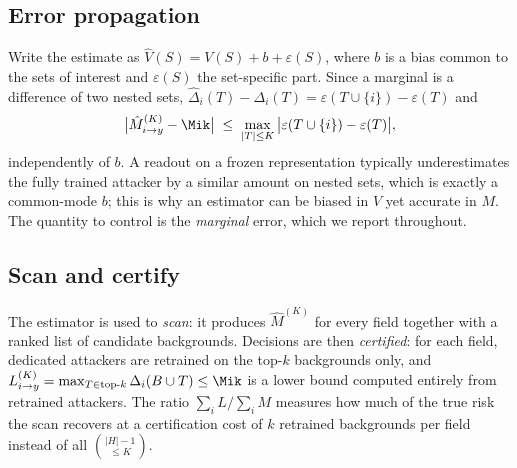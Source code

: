 \subsection{Error propagation}
Write the estimate as $\hat V(S)=V(S)+b+\varepsilon(S)$, where $b$ is a bias common to the sets
of interest and $\varepsilon(S)$ the set-specific part. Since a marginal is a difference of two
nested sets, $\hat\Delta_i(T)-\Delta_i(T)=\varepsilon(T\cup\{i\})-\varepsilon(T)$ and
\begin{equation}\label{eq:prop}
\big|\hat M^{(K)}_{i\to y} - \Mik\big| \;\le\; \max_{|T|\le K}\big|\varepsilon(T\cup\{i\})-\varepsilon(T)\big|,
\end{equation}
independently of $b$. A readout on a frozen representation typically underestimates the fully
trained attacker by a similar amount on nested sets, which is exactly a common-mode $b$; this is
why an estimator can be biased in $V$ yet accurate in $M$. The quantity to control is the
\emph{marginal} error, which we report throughout.

\subsection{Scan and certify}\label{sec:scan}
The estimator is used to \emph{scan}: it produces $\hat M^{(K)}$ for every field together with a
ranked list of candidate backgrounds. Decisions are then \emph{certified}: for each field,
dedicated attackers are retrained on the top-$k$ backgrounds only, and
$L^{(K)}_{i\to y}=\max_{T\in\text{top-}k}\Delta_i(B\cup T)\le\Mik$ is a lower bound computed
entirely from retrained attackers. The ratio $\sum_i L/\sum_i M$ measures how much of the true
risk the scan recovers at a certification cost of $k$ retrained backgrounds per field instead
of all $\binom{|H|-1}{\le K}$.
